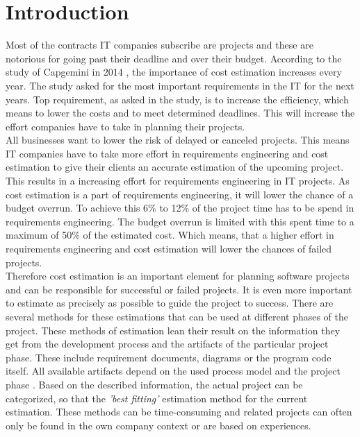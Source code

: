\chapter{Introduction}

Most of the contracts IT companies subscribe are projects and these are notorious for going past their deadline and over their budget. According to the study of Capgemini in 2014 \cite{capgemini}, the importance of cost estimation increases every year. The study asked for the most important requirements in the IT for the next years. Top requirement, as asked in the study, is to increase the efficiency, which means to lower the costs and to meet determined deadlines. This will increase the effort companies have to take in planning their projects.\\
All businesses want to lower the risk of delayed or canceled projects. This means IT companies have to take more effort in requirements engineering and cost estimation to give their clients an accurate estimation of the upcoming project. This results in a increasing effort for requirements engineering in IT projects. As cost estimation is a part of requirements engineering, it will lower the chance of a budget overrun. To achieve this 6\% to 12\% of the project time has to be spend in requirements engineering. The budget overrun is limited with this spent time to a maximum of 50\% of the estimated cost\cite{Partsch}. Which means, that a higher effort in requirements engineering and cost estimation will lower the chances of failed projects.\\
Therefore cost estimation is an important element for planning software projects and can be responsible for successful or failed projects. It is even more important to estimate as precisely as possible to guide the project to success. There are several methods for these estimations that can be used at different phases of the project. These methods of estimation lean their result on the information they get from the development process and the artifacts of the particular project phase. These include requirement documents, diagrams or the program code itself. All available artifacts depend on the used process model and the project phase \cite{EntwicklungKompakt}. Based on the described information, the actual project can be categorized, so that the \textit{'best fitting'} estimation method for the current estimation. These methods can be time-consuming and related projects can often only be found in the own company context or are based on experiences.\\
